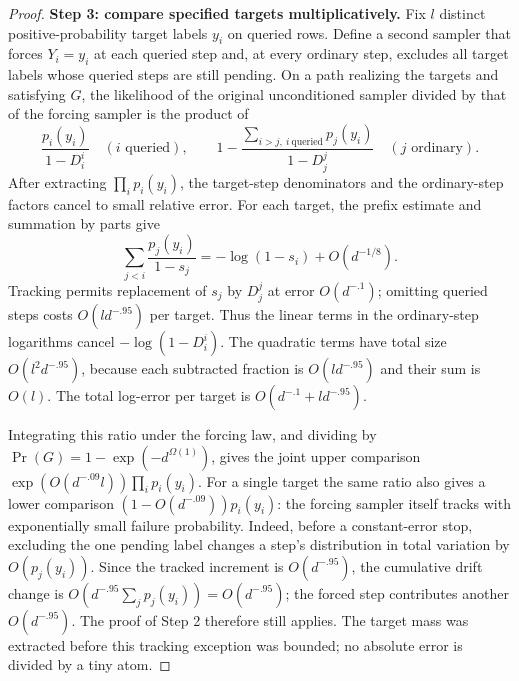 \begin{proof}
\noindent\textbf{Step 3: compare specified targets multiplicatively.}\quad
Fix \(l\) distinct positive-probability target labels \(y_i\) on queried
rows. Define a second sampler that forces \(Y_i=y_i\) at each queried
step and, at every ordinary step, excludes all target labels whose
queried steps are still pending. On a path realizing the targets and
satisfying \(G\), the likelihood of the original unconditioned sampler
divided by that of the forcing sampler is the product of
\[
 \frac{p_i(y_i)}{1-D_i^i}\quad(i\text{ queried}),\qquad
 1-\frac{\sum_{i>j,\ i\ \mathrm{queried}}p_j(y_i)}{1-D_j^j}
       \quad(j\text{ ordinary}).
\]
After extracting \(\prod_i p_i(y_i)\), the target-step denominators and
the ordinary-step factors cancel to small relative error. For each target,
the prefix estimate and summation by parts give
\[
 \sum_{j<i}\frac{p_j(y_i)}{1-s_j}
       =-\log(1-s_i)+O(d^{-1/8}).
\]
Tracking permits replacement of \(s_j\) by \(D_j^j\) at error
\(O(d^{-.1})\); omitting queried steps costs \(O(l d^{-.95})\) per
target. Thus the linear terms in the ordinary-step logarithms cancel
\(-\log(1-D_i^i)\). The quadratic terms have total size
\(O(l^2d^{-.95})\), because each subtracted fraction is
\(O(l d^{-.95})\) and their sum is \(O(l)\). The total log-error per
target is \(O(d^{-.1}+l d^{-.95})\).

Integrating this ratio under the forcing law, and dividing by
\(\Pr(G)=1-\exp(-d^{\Omega(1)})\), gives the joint upper comparison
\(\exp(O(d^{-.09}l))\prod_i p_i(y_i)\). For a single target the same
ratio also gives a lower comparison \((1-O(d^{-.09}))p_i(y_i)\): the
forcing sampler itself tracks with exponentially small failure
probability. Indeed, before a constant-error stop, excluding the one
pending label changes a step's distribution in total variation by
\(O(p_j(y_i))\). Since the tracked increment is \(O(d^{-.95})\), the
cumulative drift change is
\(O(d^{-.95}\sum_jp_j(y_i))=O(d^{-.95})\); the forced step contributes
another \(O(d^{-.95})\). The proof of Step 2 therefore still applies.
The target mass was extracted before this tracking exception was bounded;
no absolute error is divided by a tiny atom.


\end{proof}
